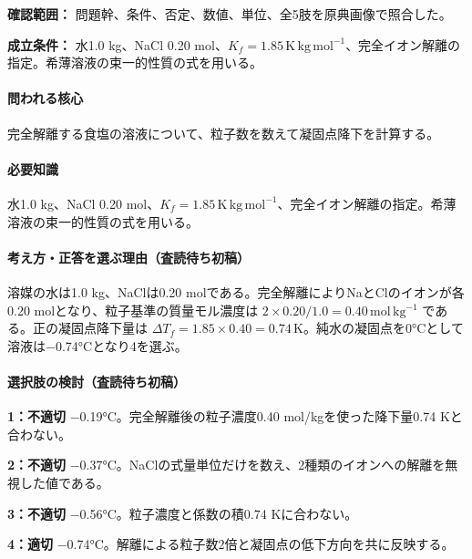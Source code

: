 \noindent\textbf{確認範囲：} 問題幹、条件、否定、数値、単位、全5肢を原典画像で照合した。\par

\noindent\textbf{成立条件：} 水1.0 kg、NaCl 0.20 mol、\(K_f=1.85\,\mathrm{K\,kg\,mol^{-1}}\)、完全イオン解離の指定。希薄溶液の束一的性質の式を用いる。\par

\paragraph{問われる核心} 完全解離する食塩の溶液について、粒子数を数えて凝固点降下を計算する。

\paragraph{必要知識} 水1.0 kg、NaCl 0.20 mol、\(K_f=1.85\,\mathrm{K\,kg\,mol^{-1}}\)、完全イオン解離の指定。希薄溶液の束一的性質の式を用いる。

\paragraph{考え方・正答を選ぶ理由（査読待ち初稿）} 溶媒の水は1.0 kg、NaClは0.20 molである。完全解離によりNaとClのイオンが各0.20 molとなり、粒子基準の質量モル濃度は \(2\times0.20/1.0=0.40\,\mathrm{mol\,kg^{-1}}\) である。正の凝固点降下量は \(\Delta T_f=1.85\times0.40=0.74\,\mathrm K\)。純水の凝固点を0°Cとして溶液は−0.74°Cとなり4を選ぶ。

\paragraph{選択肢の検討（査読待ち初稿）}\mbox{}\par

\noindent\textbf{1：不適切} −0.19°C。完全解離後の粒子濃度0.40 mol/kgを使った降下量0.74 Kと合わない。\par

\noindent\textbf{2：不適切} −0.37°C。NaClの式量単位だけを数え、2種類のイオンへの解離を無視した値である。\par

\noindent\textbf{3：不適切} −0.56°C。粒子濃度と係数の積0.74 Kに合わない。\par

\noindent\textbf{4：適切} −0.74°C。解離による粒子数2倍と凝固点の低下方向を共に反映する。\par

